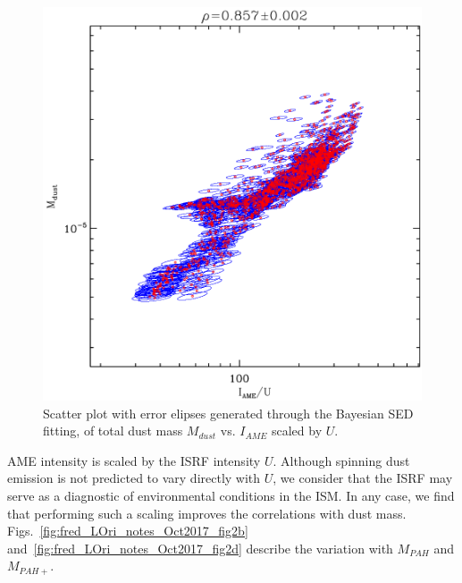                 \begin{figure}
                 \includegraphics[width=\textwidth]{../Plots/ch_lori/fred_LOri_notes_Oct2017_fig2a.pdf}
                 \centering
                 \caption{Scatter plot with error elipses generated through the Bayesian SED fitting, of total dust mass $M_{dust}$ vs. $I_{AME}$ scaled by $U$.}
                 \label{fig:fred_LOri_notes_Oct2017_fig2a}
               \end{figure}
           AME intensity is scaled by the ISRF intensity $U$. Although spinning dust emission is not predicted to vary directly with $U$, we consider that the ISRF may serve as a diagnostic of environmental conditions in the ISM. In any case, we find that performing such a scaling improves the correlations with dust mass.   Figs.~\ref{fig:fred_LOri_notes_Oct2017_fig2b} and~\ref{fig:fred_LOri_notes_Oct2017_fig2d} describe the variation with $M_{PAH}$ and $M_{PAH+}$.
